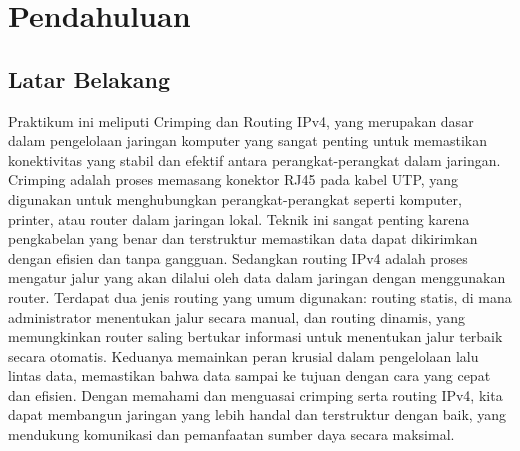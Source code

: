 \section{Pendahuluan}
\subsection{Latar Belakang}
Praktikum ini meliputi Crimping dan Routing IPv4, yang merupakan dasar dalam pengelolaan jaringan komputer yang sangat penting untuk memastikan konektivitas yang stabil dan efektif antara perangkat-perangkat dalam jaringan. Crimping adalah proses memasang konektor RJ45 pada kabel UTP, yang digunakan untuk menghubungkan perangkat-perangkat seperti komputer, printer, atau router dalam jaringan lokal. Teknik ini sangat penting karena pengkabelan yang benar dan terstruktur memastikan data dapat dikirimkan dengan efisien dan tanpa gangguan. Sedangkan routing IPv4 adalah proses mengatur jalur yang akan dilalui oleh data dalam jaringan dengan menggunakan router.
Terdapat dua jenis routing yang umum digunakan: routing statis, di mana administrator menentukan jalur secara manual, dan routing dinamis, yang memungkinkan router saling bertukar informasi untuk menentukan jalur terbaik secara otomatis. Keduanya memainkan peran krusial dalam pengelolaan lalu lintas data, memastikan bahwa data sampai ke tujuan dengan cara yang cepat dan efisien. Dengan memahami dan menguasai crimping serta routing IPv4, kita dapat membangun jaringan yang lebih handal dan terstruktur dengan baik, yang mendukung komunikasi dan pemanfaatan sumber daya secara maksimal.

